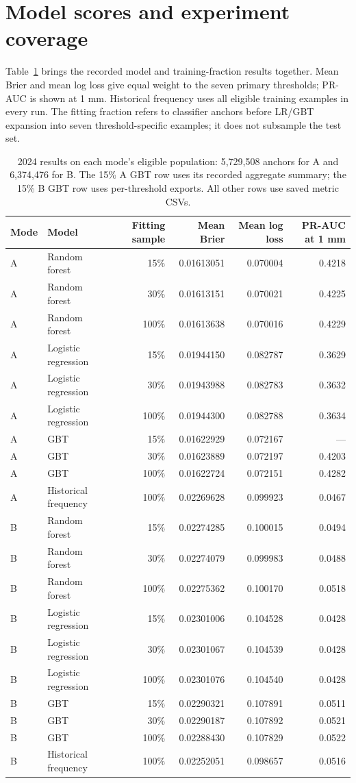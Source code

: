 \documentclass[11pt,a4paper]{article}
\begin{document}
\section{Model scores and experiment coverage}\label{app:experiments}
Table~\ref{tab:allmodels} brings the recorded model and training-fraction results together. Mean Brier and mean log loss give equal weight to the seven primary thresholds; PR-AUC is shown at 1 mm. Historical frequency uses all eligible training examples in every run. The fitting fraction refers to classifier anchors before LR/GBT expansion into seven threshold-specific examples; it does not subsample the test set.
\begin{table}[htbp]\centering\small
\begin{tabular}{llrrrr}\toprule
Mode & Model & Fitting sample & Mean Brier & Mean log loss & PR-AUC at 1 mm\\\midrule
A & Random forest & 15\% & 0.01613051 & 0.070004 & 0.4218 \\
A & Random forest & 30\% & 0.01613151 & 0.070021 & 0.4225 \\
A & Random forest & 100\% & 0.01613638 & 0.070016 & 0.4229 \\
A & Logistic regression & 15\% & 0.01944150 & 0.082787 & 0.3629 \\
A & Logistic regression & 30\% & 0.01943988 & 0.082783 & 0.3632 \\
A & Logistic regression & 100\% & 0.01944300 & 0.082788 & 0.3634 \\
A & GBT & 15\% & 0.01622929 & 0.072167 & --- \\
A & GBT & 30\% & 0.01623889 & 0.072197 & 0.4203 \\
A & GBT & 100\% & 0.01622724 & 0.072151 & 0.4282 \\
A & Historical frequency & 100\% & 0.02269628 & 0.099923 & 0.0467 \\
B & Random forest & 15\% & 0.02274285 & 0.100015 & 0.0494 \\
B & Random forest & 30\% & 0.02274079 & 0.099983 & 0.0488 \\
B & Random forest & 100\% & 0.02275362 & 0.100170 & 0.0518 \\
B & Logistic regression & 15\% & 0.02301006 & 0.104528 & 0.0428 \\
B & Logistic regression & 30\% & 0.02301067 & 0.104539 & 0.0428 \\
B & Logistic regression & 100\% & 0.02301076 & 0.104540 & 0.0428 \\
B & GBT & 15\% & 0.02290321 & 0.107891 & 0.0511 \\
B & GBT & 30\% & 0.02290187 & 0.107892 & 0.0521 \\
B & GBT & 100\% & 0.02288430 & 0.107829 & 0.0522 \\
B & Historical frequency & 100\% & 0.02252051 & 0.098657 & 0.0516 \\
\bottomrule\end{tabular}
\caption{2024 results on each mode's eligible population: 5,729,508 anchors for A and 6,374,476 for B. The 15\% A GBT row uses its recorded aggregate summary; the 15\% B GBT row uses per-threshold exports. All other rows use saved metric CSVs.}\label{tab:allmodels}
\end{table}
\end{document}
